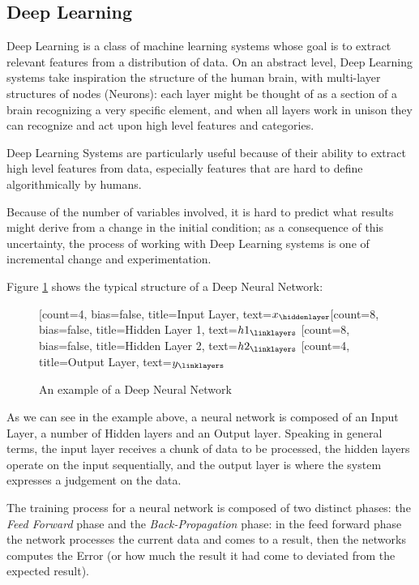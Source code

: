 \subsection{Deep Learning}\label{subsec:deep-learning}
Deep Learning is a class of machine learning systems whose goal is to extract relevant features from a distribution of data. On an abstract level, Deep Learning systems take inspiration the structure of the human brain, with multi-layer structures of nodes (Neurons): each layer might be thought of as a section of a brain recognizing a very specific element, and when all layers work in unison they can recognize and act upon high level features and categories.

Deep Learning Systems are particularly useful because of their ability to extract high level features from data, especially features that are hard to define algorithmically by humans.

Because of the number of variables involved, it is hard to predict what results might derive from a change in the initial condition; as a consequence of this uncertainty, the process of working with Deep Learning systems is one of incremental change and experimentation. 

Figure \ref{fig:DNN} shows the typical structure of a Deep Neural Network:
\begin{figure}[H]
\centering    
\begin{neuralnetwork}[height=8]
\newcommand{\x}[2]{$x_#2$}
\newcommand{\y}[2]{$y_#2$}
\newcommand{\hfirst}[2]{\small $h1_#2$}
\newcommand{\hsecond}[2]{\small $h2_#2$}
[count=4, bias=false, title=Input Layer, text=\x]
\hiddenlayer[count=8, bias=false, title=Hidden Layer 1, text=\hfirst] \linklayers
\hiddenlayer[count=8, bias=false, title=Hidden Layer 2, text=\hsecond] \linklayers
\outputlayer[count=4, title=Output Layer, text=\y] \linklayers
\end{neuralnetwork}
\caption{An example of a Deep Neural Network}\label{fig:DNN}
\end{figure}
As we can see in the example above, a neural network is composed of an Input Layer, a number of Hidden layers and an Output layer.
Speaking in general terms, the input layer receives a chunk of data to be processed, the hidden layers operate on the input sequentially, and the output layer is where the system expresses a judgement on the data.

The training process for a neural network is composed of two distinct phases: the \emph{Feed Forward} phase and the \emph{Back-Propagation} phase: in the feed forward phase the network processes the current data and comes to a result, then the networks computes the Error (or how much the result it had come to deviated from the expected result).

